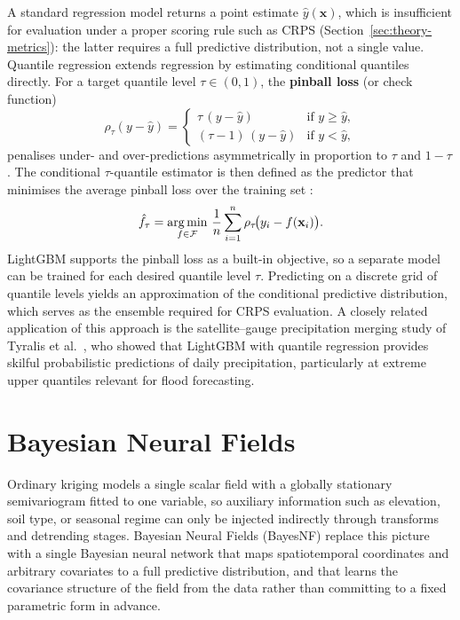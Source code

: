 A standard regression model returns a point estimate $\hat{y}(\mathbf{x})$,
which is insufficient for evaluation under a proper scoring rule such as
CRPS (Section~\ref{sec:theory-metrics}): the latter requires a full
predictive distribution, not a single value.
Quantile regression \cite{koenker1978regression} extends regression by
estimating conditional quantiles directly. For a target quantile level
$\tau \in (0, 1)$, the \textbf{pinball loss} (or check function)
\begin{equation}
  \rho_\tau(y - \hat{y})
    = \begin{cases}
      \tau\,(y - \hat{y})        & \text{if } y \geq \hat{y}, \\
      (\tau - 1)\,(y - \hat{y})  & \text{if } y < \hat{y},
    \end{cases}
  \label{eq:pinball}
\end{equation}
penalises under- and over-predictions asymmetrically in proportion to
$\tau$ and $1 - \tau$.
The conditional $\tau$-quantile estimator is then defined as the predictor
that minimises the average pinball loss over the training set
\cite{koenker1978regression}:
\begin{equation}
  \hat{f}_\tau
    = \operatorname*{arg\,min}_{f \in \mathcal{F}}\,
      \frac{1}{n}\sum_{i=1}^{n} \rho_\tau\!\bigl(y_i - f(\mathbf{x}_i)\bigr).
  \label{eq:quantile-estimator}
\end{equation}
LightGBM supports the pinball loss as a built-in objective, so a separate
model can be trained for each desired quantile level $\tau$.
Predicting on a discrete grid of quantile levels yields an approximation
of the conditional predictive distribution, which serves as the ensemble
required for CRPS evaluation.
A closely related application of this approach is the satellite--gauge
precipitation merging study of Tyralis et al.~\cite{tyralis2023lightgbm},
who showed that LightGBM with quantile regression provides skilful
probabilistic predictions of daily precipitation, particularly at extreme
upper quantiles relevant for flood forecasting.

\section{Bayesian Neural Fields}
\label{sec:theory-bayesnf}

Ordinary kriging models a single scalar field with a globally stationary
semivariogram fitted to one variable, so auxiliary information such as
elevation, soil type, or seasonal regime can only be injected indirectly
through transforms and detrending stages. Bayesian Neural Fields (BayesNF)
\cite{saad2024bnf} replace this picture with a single Bayesian neural
network that maps spatiotemporal coordinates and arbitrary covariates to
a full predictive distribution, and that learns the covariance structure
of the field from the data rather than committing to a fixed parametric
form in advance.

